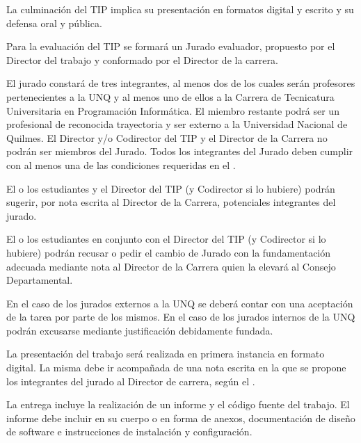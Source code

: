 
\articulo La culminación del TIP implica su presentación en formatos digital y
 escrito y su defensa oral y pública.

\articulo Para la evaluación del TIP se formará
un Jurado evaluador, propuesto por el Director del trabajo y conformado por el
Director de la carrera.

\articulo El jurado constará de tres integrantes, al menos dos de los cuales
serán profesores pertenecientes a la UNQ y al menos uno de ellos a la Carrera de
Tecnicatura Universitaria en Programación Informática. El miembro restante podrá ser
un profesional de reconocida trayectoria y ser externo a la Universidad Nacional de
Quilmes. El Director y/o Codirector del TIP y el Director de la Carrera no podrán ser
miembros del Jurado. Todos los integrantes del Jurado deben cumplir con al menos
una de las condiciones requeridas en el \artCondDirector.

\articulo El o los estudiantes y el Director del TIP (y Codirector si lo
hubiere) podrán sugerir, por nota escrita al Director de la Carrera, potenciales
integrantes del jurado.

\articulo El o los estudiantes en conjunto con el Director del TIP (y
Codirector si lo hubiere) podrán recusar o pedir el cambio de Jurado con la
fundamentación adecuada mediante nota al Director de la Carrera quien la elevará al
Consejo Departamental.

\articulo En el caso de los jurados externos a la UNQ se deberá contar
con una aceptación de la tarea por parte de los mismos. En el caso de los jurados
internos de la UNQ podrán excusarse mediante justificación debidamente fundada. 


\articulo La presentación del trabajo será realizada en primera instancia en
formato digital. La misma debe ir acompañada de una nota escrita en la que se
propone los integrantes del jurado al Director de carrera, según el
\anexoEntregaDigitalTIP.

\articulo La entrega incluye la realización de un informe y el código fuente del
trabajo. El informe debe incluir en su cuerpo o en forma de anexos,
documentación de diseño de software e instrucciones de instalación y
configuración.

